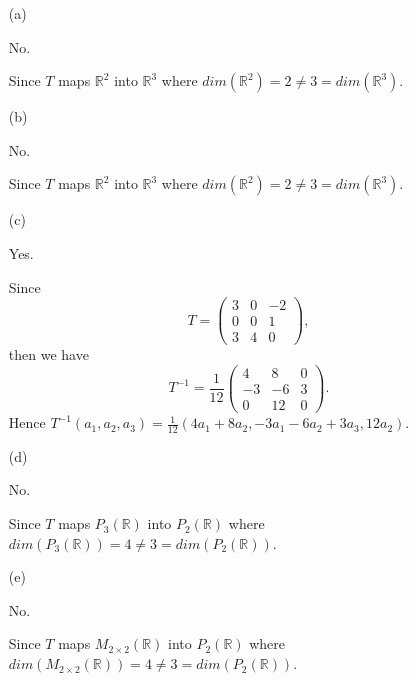 \begin{Exercise}
\begin{enumerate}[(a)]
\item[(a)]
\begin{answer}
No.
\end{answer}
\begin{solution}
Since $T$ maps $\mathbb{R}^2$ into $\mathbb{R}^3$ where $dim(\mathbb{R}^2) = 2 \neq 3 = dim(\mathbb{R}^3)$.
\end{solution}

\item[(b)]
\begin{answer}
No.
\end{answer}
\begin{solution}
Since $T$ maps $\mathbb{R}^2$ into $\mathbb{R}^3$ where $dim(\mathbb{R}^2) = 2 \neq 3 = dim(\mathbb{R}^3)$.
\end{solution}

\item[(c)]
\begin{answer}
Yes.
\end{answer}
\begin{solution}
Since
$$
T = \begin{pmatrix}
3 & 0 & -2 \\
0 & 0 & 1 \\
3 & 4 & 0
\end{pmatrix},
$$
then we have
$$
T^{-1} = \frac{1}{12}\begin{pmatrix}
4 & 8 & 0 \\
-3 & -6 & 3 \\
0 & 12 & 0
\end{pmatrix}.
$$
Hence $T^{-1}(a_1,a_2,a_3) = \frac{1}{12}(4a_1+8a_2,-3a_1-6a_2+3a_3,12a_2)$.
\end{solution}

\item[(d)]
\begin{answer}
No.
\end{answer}
\begin{solution}
Since $T$ maps $P_3(\mathbb{R})$ into $P_2(\mathbb{R})$ where $dim(P_3(\mathbb{R})) = 4 \neq 3 = dim(P_2(\mathbb{R}))$.
\end{solution}

\item[(e)]
\begin{answer}
No.
\end{answer}
\begin{solution}
Since $T$ maps $M_{2\times 2}(\mathbb{R})$ into $P_2(\mathbb{R})$ where $dim(M_{2\times 2}(\mathbb{R})) = 4 \neq 3 = dim(P_2(\mathbb{R}))$.
\end{solution}


\end{enumerate}
\end{Exercise}

